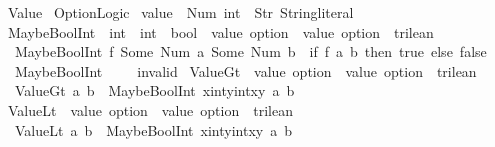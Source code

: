 %
\begin{isabellebody}%
%
%
\isadelimtheory
%
\endisadelimtheory
%
\isatagtheory
{}\isamarkupfalse%
\ Value\isanewline
{}\ Option{\isacharunderscore}Logic\isanewline
{}%
\endisatagtheory
{\isafoldtheory}%
%
\isadelimtheory
\isanewline
%
\endisadelimtheory
{}\isamarkupfalse%
\ {\isachardoublequoteopen}value{\isachardoublequoteclose}\ {\isacharequal}\ Num\ int\ {\isacharbar}\ Str\ String{\isachardot}literal\isanewline
\isanewline
{}\isamarkupfalse%
\ MaybeBoolInt\ {\isacharcolon}{\isacharcolon}\ {\isachardoublequoteopen}{\isacharparenleft}int\ {\isasymRightarrow}\ int\ {\isasymRightarrow}\ bool{\isacharparenright}\ {\isasymRightarrow}\ value\ option\ {\isasymRightarrow}\ value\ option\ {\isasymRightarrow}\ trilean{\isachardoublequoteclose}\ \isanewline
\ \ {\isachardoublequoteopen}MaybeBoolInt\ f\ {\isacharparenleft}Some\ {\isacharparenleft}Num\ a{\isacharparenright}{\isacharparenright}\ {\isacharparenleft}Some\ {\isacharparenleft}Num\ b{\isacharparenright}{\isacharparenright}\ {\isacharequal}\ {\isacharparenleft}if\ f\ a\ b\ then\ true\ else\ false{\isacharparenright}{\isachardoublequoteclose}\ {\isacharbar}\isanewline
\ \ {\isachardoublequoteopen}MaybeBoolInt\ {\isacharunderscore}\ {\isacharunderscore}\ {\isacharunderscore}\ {\isacharequal}\ invalid{\isachardoublequoteclose}\isanewline
\isanewline
{}\isamarkupfalse%
\ ValueGt\ {\isacharcolon}{\isacharcolon}\ {\isachardoublequoteopen}value\ option\ {\isasymRightarrow}\ value\ option\ {\isasymRightarrow}\ trilean{\isachardoublequoteclose}\ \ \isanewline
\ \ {\isachardoublequoteopen}ValueGt\ a\ b\ {\isasymequiv}\ MaybeBoolInt\ {\isacharparenleft}{\isasymlambda}x{\isacharcolon}{\isacharcolon}int{\isachardot}{\isasymlambda}y{\isacharcolon}{\isacharcolon}int{\isachardot}{\isacharparenleft}x{\isachargreater}y{\isacharparenright}{\isacharparenright}\ a\ b{\isachardoublequoteclose}\isanewline
\isanewline
{}\isamarkupfalse%
\ ValueLt\ {\isacharcolon}{\isacharcolon}\ {\isachardoublequoteopen}value\ option\ {\isasymRightarrow}\ value\ option\ {\isasymRightarrow}\ trilean{\isachardoublequoteclose}\ \ \isanewline
\ \ {\isachardoublequoteopen}ValueLt\ a\ b\ {\isasymequiv}\ MaybeBoolInt\ {\isacharparenleft}{\isasymlambda}x{\isacharcolon}{\isacharcolon}int{\isachardot}{\isasymlambda}y{\isacharcolon}{\isacharcolon}int{\isachardot}{\isacharparenleft}x{\isacharless}y{\isacharparenright}{\isacharparenright}\ a\ b{\isachardoublequoteclose}\isanewline

\end{isabellebody}
